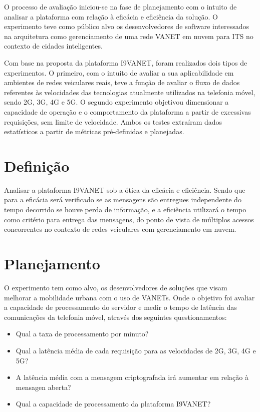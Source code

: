 \documentclass[
	12pt,				%
	oneside,			%
	a4paper,			%
	english,			%
	brazil				%
	]{abntex2ppgsi}
\begin{document}
O processo de avaliação iniciou-se na fase de planejamento com o intuito de analisar a plataforma com relação à eficácia e eficiência da solução. O experimento teve como público alvo os desenvolvedores de software interessados na arquitetura como gerenciamento de uma rede VANET em nuvem para ITS no contexto de cidades inteligentes.

Com base na proposta da plataforma I9VANET, foram realizados dois tipos de experimentos. O primeiro, com o intuito de avaliar a sua aplicabilidade em ambientes de redes veiculares reais, teve a função de avaliar o fluxo de dados referentes às velocidades das tecnologias atualmente utilizados na telefonia móvel, sendo 2G, 3G, 4G e 5G. O segundo experimento objetivou dimensionar a capacidade de operação e o comportamento da plataforma a partir de excessivas requisições, sem limite de velocidade. Ambos os testes extraíram dados estatísticos a partir de métricas pré-definidas e planejadas.

\section{Definição}

Analisar a plataforma I9VANET  sob a ótica da eficácia e eficiência. Sendo que para a eficácia será verificado se as mensagens são entregues independente do tempo decorrido se houve perda de informação, e a eficiência utilizará o tempo como critério para entrega das mensagens, do ponto de vista de múltiplos acessos concorrentes no contexto de redes veiculares com gerenciamento em nuvem. 


\section{Planejamento}
O experimento tem como alvo, os desenvolvedores de soluções que visam melhorar a mobilidade urbana com o uso de VANETs. Onde o objetivo foi avaliar a capacidade de processamento do servidor e medir o tempo de latência das comunicações da telefonia móvel, através dos seguintes questionamentos:
\begin{itemize}
	\item {Qual a taxa de processamento por minuto?}
	\item {Qual a latência média de cada requisição para as velocidades de 2G, 3G, 4G e 5G?}
	\item {A latência média com a mensagem criptografada irá aumentar em relação à mensagen aberta?}
	\item {Qual a capacidade de processamento da plataforma I9VANET?}
\end{itemize} 
\end{document}
